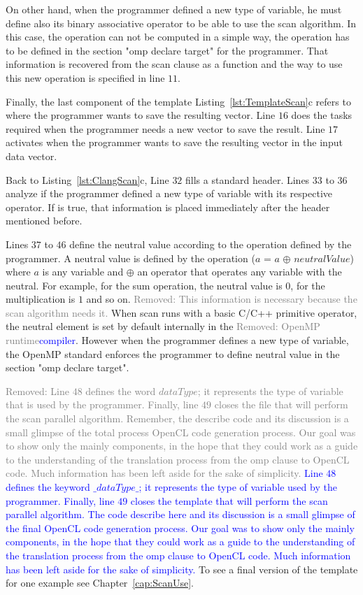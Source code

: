 \documentclass[Ingles]{ic-tese-v1}
\newcommand{\rem}[1]{\noindent\textcolor{gray}{Removed: {#1}}}
\newcommand{\new}[1]{\noindent\textcolor{blue}{ {#1}}}
\newcommand{\rem}[1]{}
\newcommand{\new}[1]{#1}
\newcommand{\rcap}[1]{Chapter~\ref{cap:#1}}
\newcommand{\rlst}[1]{Listing~\ref{lst:#1}}
\begin{document}
On other hand, when the programmer defined a new type of variable, he must
define also its binary associative operator to be able to use the scan
algorithm. In this case, the operation can not be computed in a simple way, the
operation has to be defined in the section "omp declare target" for the
programmer. That information is recovered from the scan clause as a function
and the way to use this new operation is specified in line $11$.

Finally, the last component of the template \rlst{TemplateScan}{c} refers to
where the programmer wants to save the resulting vector. Line $16$ does the  tasks
required  when the programmer needs a new vector to save the result. Line $17$ activates when
the programmer wants to save the resulting vector in the input data vector.

Back to \rlst{ClangScan}{c}, Line $32$ fills a standard header. Lines $33$
to $36$ analyze if the programmer defined a new type of variable with its
respective operator. If is true, that information is placed immediately after
the header mentioned before.

Lines $37$ to $46$ define the neutral value according to the operation defined
by the programmer.  A neutral value is defined by the operation ($a$ = $a$
$\oplus$ $neutralValue$) where $a$ is any variable and $\oplus$ an operator
that operates any variable with the neutral. For example, for the sum
operation, the neutral value is $0$, for the multiplication is $1$ and so on.
\rem{This information is necessary because the scan algorithm needs it.} When
scan runs  with a basic C/C++ primitive  operator, the neutral  element is set
by default internally in the \rem{OpenMP runtime}\new{compiler}. However when
the programmer defines a new type of variable, the OpenMP standard enforces
the programmer  to define neutral value in the section "omp declare target".

\rem{Line $48$ defines the word $dataType$; it represents the type of variable that
is used by the programmer. Finally, line $49$ closes the file that will
perform the scan parallel algorithm. Remember, the describe code and its  discussion  is a small
glimpse of the total process OpenCL code generation process. Our goal was to show
only the mainly components, in the hope that they could work as a guide to the
understanding of the translation process from the omp clause
to OpenCL code. Much information has been left aside for the sake of simplicity.}
\new{Line $48$ defines the keyword $\_dataType\_$; it represents the type of
variable used by the programmer. Finally, line $49$ closes the template that
will perform the scan parallel algorithm. The code describe here and its
discussion is a small glimpse of the final OpenCL code generation process. Our
goal was to show only the mainly components, in the hope that they could work
as a guide to the understanding of the translation process from the omp clause
to OpenCL code. Much information has been left aside for the sake of
simplicity.}
To see a final version of the template for one example see \rcap{ScanUse}.
\end{document}
